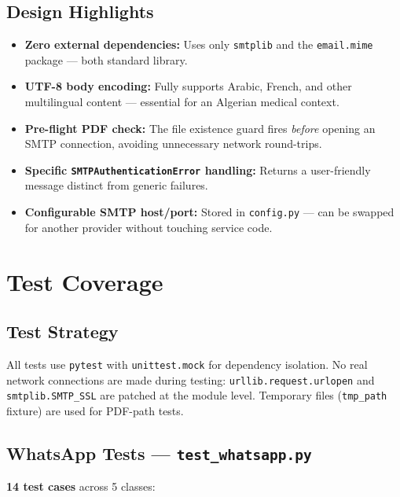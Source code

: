 \documentclass[12pt, a4paper]{article}
\begin{document}
\subsection{Design Highlights}

\begin{itemize}[leftmargin=1.5em]
  \item \textbf{Zero external dependencies:} Uses only \texttt{smtplib} and
        the \texttt{email.mime} package — both standard library.
  \item \textbf{UTF-8 body encoding:} Fully supports Arabic, French, and other
        multilingual content — essential for an Algerian medical context.
  \item \textbf{Pre-flight PDF check:} The file existence guard fires
        \emph{before} opening an SMTP connection, avoiding unnecessary
        network round-trips.
  \item \textbf{Specific \texttt{SMTPAuthenticationError} handling:} Returns a
        user-friendly message distinct from generic failures.
  \item \textbf{Configurable SMTP host/port:} Stored in \texttt{config.py} —
        can be swapped for another provider without touching service code.
\end{itemize}

\section{Test Coverage}

\subsection{Test Strategy}

All tests use \texttt{pytest} with \texttt{unittest.mock} for dependency
isolation. No real network connections are made during testing:
\texttt{urllib.request.urlopen} and \texttt{smtplib.SMTP\_SSL} are patched
at the module level. Temporary files (\texttt{tmp\_path} fixture) are used for
PDF-path tests.

\subsection{WhatsApp Tests — \texttt{test\_whatsapp.py}}

\textbf{14 test cases} across 5 classes:
\end{document}
